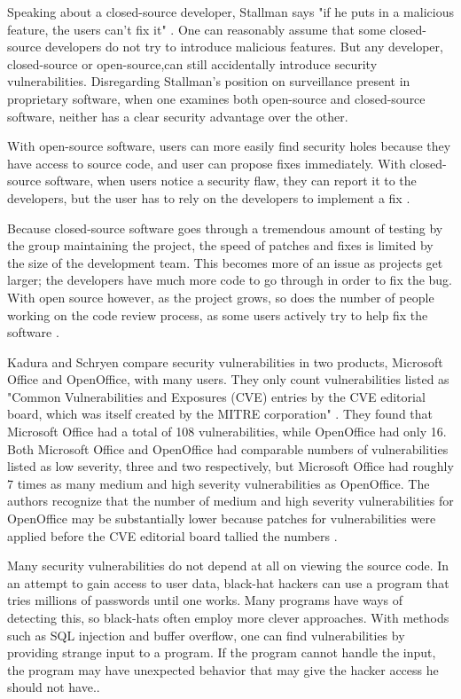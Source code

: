 ﻿Speaking about a closed-source developer, Stallman says "if he puts in a
malicious feature, the users can't fix it" \citeyear[para. 36]{rms2011}.
One can reasonably assume that some closed-source developers do not try
to introduce malicious features. But any developer, closed-source or
open-source,can still accidentally introduce security
vulnerabilities. Disregarding Stallman's position on surveillance present in
proprietary software, when one examines both open-source and closed-source
software, neither has a clear security advantage over the other.

With open-source software, users can more easily find security holes because
they have access to source code, and user can propose fixes immediately.
With closed-source software, when users notice a security flaw, they can report
it to the developers, but the user has to rely on the developers to implement a
fix \cite[para. 17]{kadura}.

Because closed-source software goes through a tremendous amount of testing
by the group maintaining the project, the speed of patches and fixes is limited
by the size of the development team. This becomes more of an issue as projects
get larger; the developers have much more code to go through in order to fix the
bug. With open source however, as the project grows, so does the number of
people working on the code review process, as some users actively try to help
fix the software \cite[p. ~245]{boulanger}.

Kadura and Schryen compare security vulnerabilities in two products, Microsoft
Office and OpenOffice, with many users. They only count vulnerabilities listed
as "Common Vulnerabilities and Exposures (CVE) entries by the CVE editorial
board, which was itself created by the MITRE corporation"
\citeyear{kadura}. They found that Microsoft Office had a total of 108
vulnerabilities, while OpenOffice had only 16. Both Microsoft Office and
OpenOffice had comparable numbers of vulnerabilities listed as low severity,
three and two respectively, but Microsoft Office had roughly 7 times as many
medium and high severity vulnerabilities as OpenOffice. The authors recognize
that the number of medium and high severity vulnerabilities for OpenOffice may
be substantially lower because patches for vulnerabilities were applied before
the CVE editorial board tallied the numbers \cite{kadura}.

Many security vulnerabilities do not depend at all on viewing the source code.
In an attempt to gain access to user data, black-hat hackers can use a program
that tries millions of passwords until one works. Many programs have ways of
detecting this, so black-hats often employ  more clever approaches. With methods
such as SQL injection and buffer overflow, one can find vulnerabilities by
providing strange input to a program. If the program cannot handle the input,
the program may have unexpected behavior that may give the hacker access he
should not have.\cite[p. ~8-9]{clarke}.

